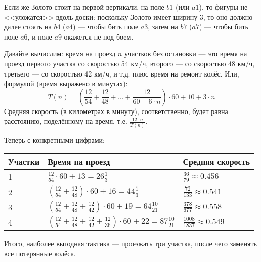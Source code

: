 \begin{itemize}
Если же Золото стоит на первой вертикали, на поле $b1$ (или $a1$), то фигуры не <<уложатся>> вдоль доски: 
поскольку Золото имеет ширину 3, то оно должно далее стоять на $b4$ ($a4$) --- чтобы бить поле $a3$, 
затем на $b7$ ($a7$) --- чтобы бить поле $a6$, и поле $a9$ окажется не под боем.

\begin{center}\end{center}


\itC Давайте вычислим: время на проезд $n$ участков без остановки --- 
это время на проезд первого участка 
со скоростью 54 км/ч, второго --- со скоростью 48 км/ч, третьего --- со скоростью 42 км/ч, и т.д.
плюс время на ремонт колёс. Или, формулой (время выражено в минутах):
 $$T(n) = \left(\frac{12}{54} + \frac{12}{48} + \dots + \frac{12}{60 - 6 \cdot n}\right) \cdot 60 + 10 + 3 \cdot n$$
Средняя скорость (в километрах в минуту), соответственно, будет равна расстоянию, поделённому на время, т.е.
$\frac{12 \cdot n}{T(n)}$.

Теперь с конкретными цифрами:

\begin{tabular}{lll}
Участки & Время на проезд & Средняя скорость \\
\hline
1	& $\frac{12}{54} \cdot 60 + 13 = 26\frac{1}{3}$ & $\frac{36}{79} \approx 0.456$ \\
2	& $\left(\frac{12}{54} + \frac{12}{48}\right) \cdot 60 + 16 = 44\frac{1}{3}$ & $\frac{72}{133} \approx 0.541$ \\
3	& $\left(\frac{12}{54} + \frac{12}{48} + \frac{12}{42}\right) \cdot 60 + 19 = 64\frac{10}{21}$ & $\frac{378}{677} \approx 0.558$ \\
4	& $\left(\frac{12}{54} + \frac{12}{48} + \frac{12}{42} + \frac{12}{36}\right) \cdot 60 + 22 = 87\frac{10}{21}$ & $\frac{1008}{1837} \approx 0.549$
\end{tabular}

Итого, наиболее выгодная тактика --- проезжать три участка, после чего заменять все потерянные колёса.
\end{itemize}